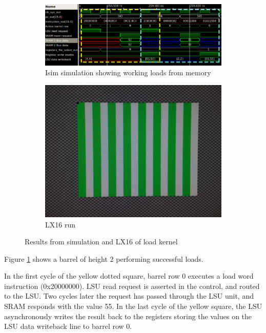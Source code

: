 \documentclass[../main/report.tex]{subfiles}
\begin{document}
\begin{figure}[H]
  \centering
  \begin{subfigure}[b]{\textwidth}
    \includegraphics[width=\textwidth]{../testing/assets/Load-Store-working.png}
    \caption{Isim simulation showing working loads from memory}
    \label{fig:isim-load-kernel}
  \end{subfigure}
  \begin{subfigure}[b]{0.3\textwidth}
    \includegraphics[width=\textwidth]{../testing/assets/halfworking-load.jpg}
    \caption{LX16 run}
    \label{fig:LX16-load-kernel}
  \end{subfigure}
  \caption{Results from simulation and LX16 of load kernel}
\end{figure}

Figure \ref{fig:isim-load-kernel} shows a barrel of height 2 performing successful loads.

In the first cycle of the yellow dotted square, barrel row 0 executes a load word instruction (0x20000000).
LSU read request is asserted in the control, and routed to the LSU.
Two cycles later the request has passed through the LSU unit, and SRAM responds with the value 55.
In the last cycle of the yellow square, the LSU asynchronously writes the result back to the registers storing the values on the LSU data writeback line to barrel row 0.
\end{document}
